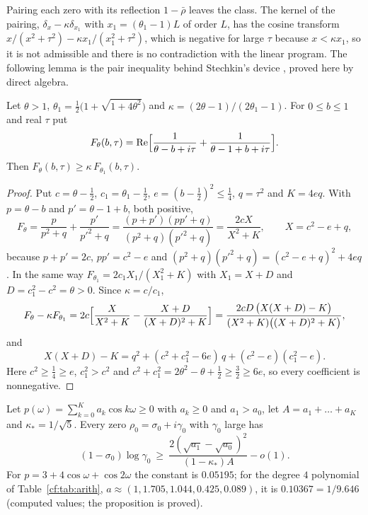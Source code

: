 Pairing each zero with its reflection $1-\bar\rho$ leaves the class. The kernel of the pairing, $\delta_x-\kappa\delta_{x_1}$ with $x_1=(\theta_1-1)L$ of order $L$, has the cosine transform $x/(x^2+\tau^2)-\kappa x_1/(x_1^2+\tau^2)$, which is negative for large $\tau$ because $x<\kappa x_1$, so it is not admissible and there is no contradiction with the linear program. The following lemma is the pair inequality behind Stechkin's device \cite{Stechkin70}, proved here by direct algebra.

\begin{lemma}\label{cf:lem:stechkin}
Let $\theta>1$, $\theta_1=\frac12\bigl(1+\sqrt{1+4\theta^2}\bigr)$ and $\kappa=(2\theta-1)/(2\theta_1-1)$. For $0\le b\le1$ and real $\tau$ put
\[
F_\theta(b,\tau)=\Re\Bigl[\frac1{\theta-b+i\tau}+\frac1{\theta-1+b+i\tau}\Bigr].
\]
Then $F_\theta(b,\tau)\ge\kappa\,F_{\theta_1}(b,\tau)$.
\end{lemma}

\begin{proof}
Put $c=\theta-\frac12$, $c_1=\theta_1-\frac12$, $e=(b-\frac12)^2\le\frac14$, $q=\tau^2$ and $K=4eq$. With $p=\theta-b$ and $p'=\theta-1+b$, both positive,
\[
F_\theta=\frac p{p^2+q}+\frac{p'}{p'^2+q}=\frac{(p+p')(pp'+q)}{(p^2+q)(p'^2+q)}=\frac{2cX}{X^2+K},\qquad X=c^2-e+q,
\]
because $p+p'=2c$, $pp'=c^2-e$ and $(p^2+q)(p'^2+q)=(c^2-e+q)^2+4eq$. In the same way $F_{\theta_1}=2c_1X_1/(X_1^2+K)$ with $X_1=X+D$ and $D=c_1^2-c^2=\theta>0$. Since $\kappa=c/c_1$,
\[
F_\theta-\kappa F_{\theta_1}=2c\Bigl[\frac X{X^2+K}-\frac{X+D}{(X+D)^2+K}\Bigr]=\frac{2cD\,\bigl(X(X+D)-K\bigr)}{(X^2+K)\bigl((X+D)^2+K\bigr)},
\]
and
\[
X(X+D)-K=q^2+(c^2+c_1^2-6e)\,q+(c^2-e)(c_1^2-e).
\]
Here $c^2\ge\frac14\ge e$, $c_1^2>c^2$ and $c^2+c_1^2=2\theta^2-\theta+\frac12\ge\frac32\ge6e$, so every coefficient is nonnegative.
\end{proof}

\begin{proposition}\label{cf:prop:stechkin}
Let $p(\omega)=\sum_{k=0}^Ka_k\cos k\omega\ge0$ with $a_k\ge0$ and $a_1>a_0$, let $A=a_1+\dots+a_K$ and $\kappa_\ast=1/\sqrt5$. Every zero $\rho_0=\sigma_0+i\gamma_0$ with $\gamma_0$ large has
\[
(1-\sigma_0)\log\gamma_0\ \ge\ \frac{2(\sqrt{a_1}-\sqrt{a_0})^2}{(1-\kappa_\ast)A}-o(1).
\]
For $p=3+4\cos\omega+\cos2\omega$ the constant is $0.05195$; for the degree $4$ polynomial of Table~\ref{cf:tab:arith}, $a\approx(1,1.705,1.044,0.425,0.089)$, it is $0.10367=1/9.646$ (computed values; the proposition is proved).
\end{proposition}

